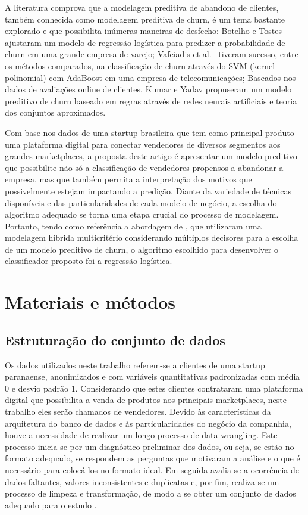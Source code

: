 \documentclass[twocolumn]{rbef}
\newcommand{\1}{\mathbbm{1}}
\begin{document}
A literatura comprova que a modelagem preditiva de abandono de clientes, também conhecida como modelagem preditiva de churn, é um tema bastante explorado e que possibilita inúmeras maneiras de desfecho: Botelho e Tostes \cite{Botelho2010} ajustaram um modelo de regressão logística para predizer a probabilidade de churn em uma grande empresa de varejo; Vafeiadis et al.~\cite{Vafeiadis2015} tiveram sucesso, entre os métodos comparados, na classificação de churn através do SVM (kernel polinomial) com AdaBoost em uma empresa de telecomunicações; Baseados nos dados de avaliações online de clientes, Kumar e Yadav \cite{Kumar2020} propuseram um modelo preditivo de churn baseado em regras através de redes neurais artificiais e teoria dos conjuntos aproximados.

Com base nos dados de uma startup brasileira que tem como principal produto uma plataforma digital para conectar vendedores de diversos segmentos aos grandes marketplaces, a proposta deste artigo é apresentar um modelo preditivo que possibilite não só a classificação de vendedores propensos a abandonar a empresa, mas que também permita a interpretação dos motivos que possivelmente estejam impactando a predição. Diante da variedade de técnicas disponíveis e das particularidades de cada modelo de negócio, a escolha do algoritmo adequado se torna uma etapa crucial do processo de modelagem. Portanto, tendo como referência a abordagem de \cite{Junior2020}, que utilizaram uma modelagem híbrida multicritério considerando múltiplos decisores para a escolha de um modelo preditivo de churn, o algoritmo escolhido para desenvolver o classificador proposto foi a regressão logística.

\hypertarget{materiais-e-muxe9todos}{%
\section{Materiais e métodos}\label{materiais-e-muxe9todos}}

\hypertarget{estruturauxe7uxe3o-do-conjunto-de-dados}{%
\subsection{Estruturação do conjunto de dados}\label{estruturauxe7uxe3o-do-conjunto-de-dados}}

Os dados utilizados neste trabalho referem-se a clientes de uma startup paranaense, anonimizados e com variáveis quantitativas padronizadas com média 0 e desvio padrão 1. Considerando que estes clientes contrataram uma plataforma digital que possibilita a venda de produtos nos principais marketplaces, neste trabalho eles serão chamados de vendedores. Devido às características da arquitetura do banco de dados e às particularidades do negócio da companhia, houve a necessidade de realizar um longo processo de data wrangling. Este processo inicia-se por um diagnóstico preliminar dos dados, ou seja, se estão no formato adequado, se respondem as perguntas que motivaram a análise e o que é necessário para colocá-los no formato ideal. Em seguida avalia-se a ocorrência de dados faltantes, valores inconsistentes e duplicatas e, por fim, realiza-se um processo de limpeza e transformação, de modo a se obter um conjunto de dados adequado para o estudo \cite{Kandel2011}.
\end{document}

